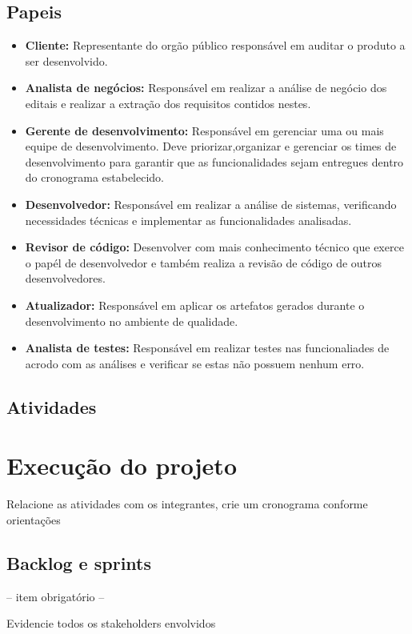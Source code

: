\documentclass[	DIV=calc,%
							paper=a4,%
							fontsize=12pt,%
							onecolumn]{scrartcl}	 					%
\begin{document}
\subsection{Papeis}
\begin{itemize}
	\item \textbf{Cliente:} Representante do orgão público responsável em auditar o produto a ser desenvolvido.
	\item \textbf{Analista de negócios:} Responsável em realizar a análise de negócio dos editais e realizar a extração dos requisitos contidos nestes. 
	\item \textbf{Gerente de desenvolvimento:} Responsável em gerenciar uma ou mais equipe de desenvolvimento. Deve priorizar,organizar e gerenciar 
	os times de desenvolvimento para garantir que as funcionalidades sejam entregues dentro do cronograma estabelecido.
	\item \textbf{Desenvolvedor:} Responsável em realizar a análise de sistemas, verificando necessidades técnicas e implementar as funcionalidades analisadas.
	\item \textbf{Revisor de código:} Desenvolver com mais conhecimento técnico que exerce o papél de desenvolvedor e também realiza 
	a revisão de código de outros desenvolvedores.
	\item \textbf{Atualizador:} Responsável em aplicar os artefatos gerados durante o desenvolvimento no ambiente de qualidade.
	\item \textbf{Analista de testes:} Responsável em realizar testes nas funcionaliades de acrodo com as análises e verificar se estas não possuem nenhum erro.
\end{itemize}

\subsection{Atividades}

\section{Execução do projeto}

Relacione as atividades com os integrantes, crie um cronograma conforme orientações
\subsection{Backlog e sprints}
-- item obrigatório --

Evidencie todos os stakeholders envolvidos
\end{document}
